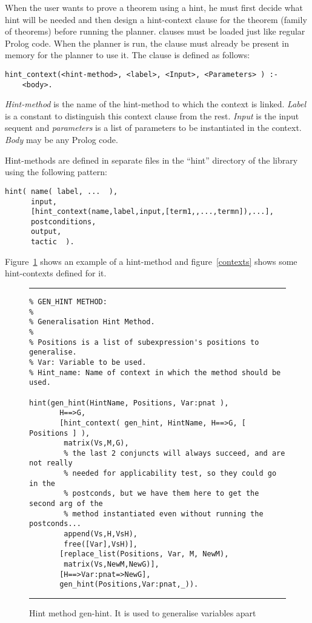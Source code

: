         When the user wants to prove a theorem using a hint, he must
first decide what hint will be needed and then design a hint-context
clause for the theorem (family of theorems) before running the planner.
 clauses must be loaded just like regular Prolog code.
When the planner is run, the  clause must already be
present in memory for the planner to use it.
        The   clause is defined as follows:

\begin{verbatim}
hint_context(<hint-method>, <label>, <Input>, <Parameters> ) :-
    <body>.
\end{verbatim}

        {\em Hint-method\/} is the name of the hint-method to which the
context is linked. {\em Label\/} is a constant to distinguish this context
clause from the rest. {\em Input\/} is the input sequent and {\em
parameters\/} is a list of parameters to be instantiated in the context.
{\em Body\/} may be any Prolog code.

        Hint-methods are defined in separate files in the ``hint''
directory of the library using the following pattern:

\begin{verbatim}
hint( name( label, ...  ),
      input,
      [hint_context(name,label,input,[term1,,...,termn]),...],
      postconditions,
      output,
      tactic  ).
\end{verbatim}

Figure~\ref{gen-hint} shows an example of a hint-method and
figure~\ref{contexts} shows some hint-contexts defined for it.


\begin{figure}[htb] \begin{center} %
\hrule
\begin{small} 
\begin{verbatim} 
% GEN_HINT METHOD:
%
% Generalisation Hint Method. 
%
% Positions is a list of subexpression's positions to generalise.
% Var: Variable to be used. 
% Hint_name: Name of context in which the method should be used.

hint(gen_hint(HintName, Positions, Var:pnat ),       
       H==>G,
       [hint_context( gen_hint, HintName, H==>G, [ Positions ] ),
        matrix(Vs,M,G),
        % the last 2 conjuncts will always succeed, and are not really
        % needed for applicability test, so they could go in the
        % postconds, but we have them here to get the second arg of the
        % method instantiated even without running the postconds...
        append(Vs,H,VsH),
        free([Var],VsH)], 
       [replace_list(Positions, Var, M, NewM),
        matrix(Vs,NewM,NewG)],
       [H==>Var:pnat=>NewG],
       gen_hint(Positions,Var:pnat,_)).
\end{verbatim}
\end{small}
\end{center}
\caption{Hint method gen-hint. It is used to generalise variables
apart}
\label{gen-hint}
\vspace{1ex}
\hrule
\end{figure}

